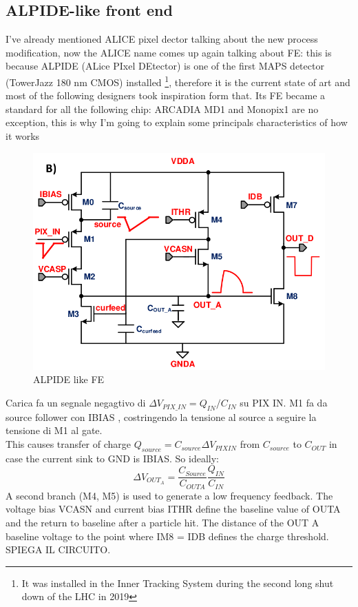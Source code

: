   \subsection{ALPIDE-like front end}
      I've already mentioned ALICE pixel dector talking about the new process modification, now the ALICE name comes up again talking about FE: this is because ALPIDE (ALice PIxel DEtector) is one of the first MAPS detector (TowerJazz 180 nm CMOS) installed \footnote{It was installed in the Inner Tracking System during the second long shut down of the LHC in 2019}, therefore it is the current state of art and most of the following designers took inspiration form that. Its FE became a standard for all the following chip: ARCADIA MD1 and Monopix1 are no exception, this is why I'm going to explain some principals characteristics of how it works\cite{ALPIDE-FE}
      \begin{figure}[h!]
         \centering
         \includegraphics[width=.7\linewidth]{figures/Pixel_detectors/ALPIDE_FE.png}
         \caption{ALPIDE like FE}
         \label{fig:ALPIDE-like}
      \end{figure}

      Carica fa un segnale negagtivo di $\Delta V_{PIX\_IN} = Q_{IN}/C_{IN}$ su PIX IN. 
      M1 fa da source follower con IBIAS , costringendo la tensione al source a seguire la tensione di M1
      al gate. \\
      This causes transfer of charge 
      $Q_{source}=C_{source}\Delta V_{PIXIN}$ from $C_{source}$ to $C_{OUT}$ in case the current sink
      to GND is IBIAS.
      So ideally:
      \begin{equation}
         \Delta V_{OUT_A} = \frac{C_{Source}}{C_{OUTA}}\frac{Q_{IN}}{C_{IN}}
      \end{equation}
      A second branch (M4, M5) is used to generate a low frequency feedback. 
      The voltage bias
      VCASN and current bias ITHR define the baseline value of OUTA and the return to baseline after
      a particle hit. The distance of the OUT A baseline voltage to the point where
      IM8 = IDB defines the charge threshold. SPIEGA IL CIRCUITO.\\
      
